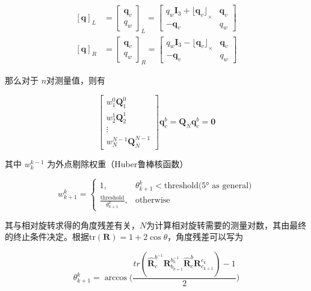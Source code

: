 \documentclass[12pt,a4paper]{article}
\begin{document}
\begin{equation}
\begin{aligned}
{[\mathbf{q}]}_L &=
{\begin{bmatrix} \mathbf{q}_v \\ q_w \end{bmatrix}}_L =
\begin{bmatrix}
{q}_{w} \mathbf{I}_{3} + {\lfloor \mathbf{q}_{v}\rfloor}_{\times} & \mathbf{q}_{v}\\
-\mathbf{q}_{v} & {q}_{w}
\end{bmatrix} \\
{[\mathbf{q}]}_R &=
{\begin{bmatrix} \mathbf{q}_v \\ q_w \end{bmatrix}}_R =
\begin{bmatrix}
{q}_{w} \mathbf{I}_{3} - {\lfloor \mathbf{q}_{v} \rfloor}_{\times} & \mathbf{q}_{v}\\
-\mathbf{q}_{v} & {q}_{w}
\end{bmatrix}
\end{aligned}
\end{equation}

那么对于 $n$对测量值，则有

\begin{equation}
\begin{bmatrix}
w^{0}_{1} \mathbf{Q}^{0}_{1} \\
w^{1}_{2} \mathbf{Q}^{1}_{2} \\
\vdots \\
w^{N-1}_{N} \mathbf{Q}^{N-1}_{N}
\end{bmatrix} 
\mathbf{q}^{b}_{c}
=
\mathbf{Q}_{N} \mathbf{q}^{b}_{c} = \boldsymbol{0}
\end{equation}

其中 $w^{k-1}_{k}$ 为外点剔除权重（Huber鲁棒核函数）

\begin{equation}
w^{k}_{k+1}
=
\left\{\begin{matrix}
1, & {\theta}^{k}_{k+1} < \text{threshold(5° as general)} \\
\frac{\text{threshold}}{\theta^{k}_{k+1}}, & \text{otherwise}
\end{matrix}\right.
\end{equation}

其与相对旋转求得的角度残差有关，$N$为计算相对旋转需要的测量对数，其由最终的终止条件决定。根据$\text{tr}(\mathbf{R}) = 1+2 \cos \theta$，角度残差可以写为

\begin{equation}
{\theta}^{k}_{k+1}
=
\arccos
\bigg(
  \frac{tr(\hat{\mathbf{R}}^{b^{-1}}_{c} \mathbf{R}^{b_{k}^{-1}}_{b_{k+1}} \hat{\mathbf{R}}^{b}_{c} \mathbf{R}^{c_{k}}_{c_{k+1}} )-1}{2}
\bigg)
\end{equation}
\end{document}
